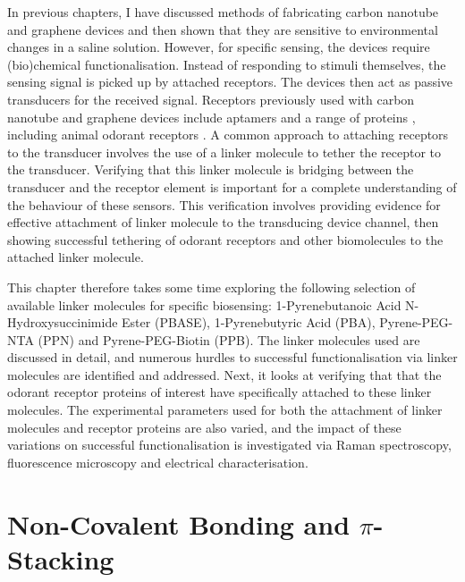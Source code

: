 \documentclass[
  a4paper,
]{scrbook}
\begin{document}
In previous chapters, I have discussed methods of fabricating carbon
nanotube and graphene devices and then shown that they are sensitive to
environmental changes in a saline solution. However, for specific
sensing, the devices require (bio)chemical functionalisation. Instead of
responding to stimuli themselves, the sensing signal is picked up by
attached receptors. The devices then act as passive transducers for the
received signal. Receptors previously used with carbon nanotube and
graphene devices include aptamers
\autocite{Khan2021,Nguyen2021,Shkodra2021,Nekrasov2021,Mishyn2022,Cassie2023}
and a range of proteins \autocite{Lerner2014,Ahn2020,Tong2020,Wang2020},
including animal odorant receptors
\autocite{Goldsmith2011,Lee2018,Murugathas2019b,Murugathas2020,Moon2020,Yoo2022}.
A common approach to attaching receptors to the transducer involves the
use of a linker molecule to tether the receptor to the transducer.
Verifying that this linker molecule is bridging between the transducer
and the receptor element is important for a complete understanding of
the behaviour of these sensors. This verification involves providing
evidence for effective attachment of linker molecule to the transducing
device channel, then showing successful tethering of odorant receptors
and other biomolecules to the attached linker molecule.

This chapter therefore takes some time exploring the following selection
of available linker molecules for specific biosensing: 1-Pyrenebutanoic
Acid N-Hydroxysuccinimide Ester (PBASE), 1-Pyrenebutyric Acid (PBA),
Pyrene-PEG-NTA (PPN) and Pyrene-PEG-Biotin (PPB). The linker molecules
used are discussed in detail, and numerous hurdles to successful
functionalisation via linker molecules are identified and addressed.
Next, it looks at verifying that that the odorant receptor proteins of
interest have specifically attached to these linker molecules. The
experimental parameters used for both the attachment of linker molecules
and receptor proteins are also varied, and the impact of these
variations on successful functionalisation is investigated via Raman
spectroscopy, fluorescence microscopy and electrical characterisation.

\hypertarget{non-covalent-bonding-and-pi-stacking}{%
\section{\texorpdfstring{Non-Covalent Bonding and
\(\pi\)-Stacking}{Non-Covalent Bonding and \textbackslash pi-Stacking}}\label{non-covalent-bonding-and-pi-stacking}}
\end{document}

